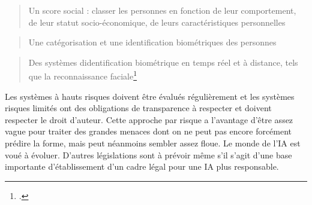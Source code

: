 	\begin{quote}
		Un score social : classer les personnes en fonction de leur
		comportement, de leur statut socio-économique, de leurs
		caractéristiques personnelles
	\end{quote}

	\begin{quote}
		Une catégorisation et une identification biométriques des personnes
	\end{quote}

	\begin{quote}
		Des systèmes d\textquotesingle identification biométrique en temps
		réel et à distance, tels que la reconnaissance faciale\footcite{loi_ia}
	\end{quote}


Les systèmes à hauts risques doivent être évalués régulièrement et les
systèmes risques limités ont des obligations de transparence à respecter
et doivent respecter le droit d'auteur. Cette approche par risque a
l'avantage d'être assez vague pour traiter des grandes menaces dont on
ne peut pas encore forcément prédire la forme, mais peut néanmoins
sembler assez floue. Le monde de l'IA est voué à évoluer. D'autres
législations sont à prévoir même s'il s'agit d'une base importante d'établissement d'un cadre légal pour une IA plus responsable.
\newline

